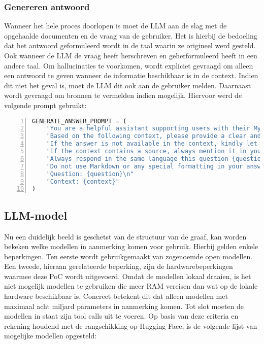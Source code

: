 \subsubsection{Genereren antwoord}

Wanneer het hele proces doorlopen is moet de LLM aan de slag met de opgehaalde documenten en de vraag van de gebruiker. Het is hierbij de bedoeling dat het antwoord geformuleerd wordt in de taal waarin ze origineel werd gesteld. Ook wanneer de LLM de vraag heeft herschreven en geherformuleerd heeft in een andere taal. Om hallucinaties te voorkomen, wordt expliciet gevraagd om alleen een antwoord te geven wanneer de informatie beschikbaar is in de context. Indien dit niet het geval is, moet de LLM dit ook aan de gebruiker melden. Daarnaast wordt gevraagd om bronnen te vermelden indien mogelijk. Hiervoor werd de volgende prompt gebruikt: 

\begin{lstlisting}[basicstyle=\small, frame=single, breaklines=true, postbreak=\mbox{\textcolor{red}{$\hookrightarrow$}\space}, escapeinside ={\%,}, escapechar={!}, numbers=left, language=Python, caption=Prompt voor genereren van antwoord op basis van de opgehaalde context]
GENERATE_ANSWER_PROMPT = (
    "You are a helpful assistant supporting users with their MyMinfin IT-related questions.\n"
    "Based on the following context, please provide a clear and complete answer.\n"
    "If the answer is not available in the context, kindly let the user know that you don't have enough information.\n"
    "If the context contains a source, always mention it in your answer as the reference.\n"
    "Always respond in the same language this question {question} is asked, even if the context is in a different language.\n"
    "Do not use Markdown or any special formatting in your answer, respond in plain text only.\n\n"
    "Question: {question}\n"
    "Context: {context}"
)
\end{lstlisting}

\subsection{LLM-model}

Nu een duidelijk beeld is geschetst van de structuur van de graaf, kan worden bekeken welke modellen in aanmerking komen voor gebruik. Hierbij gelden enkele beperkingen. Ten eerste wordt gebruikgemaakt van zogenoemde open modellen. Een tweede, hieraan gerelateerde beperking, zijn de hardwarebeperkingen waarmee deze PoC wordt uitgevoerd. Omdat de modellen lokaal draaien, is het niet mogelijk modellen te gebruiken die meer RAM vereisen dan wat op de lokale hardware beschikbaar is. Concreet betekent dit dat alleen modellen met maximaal acht miljard parameters in aanmerking komen. Tot slot moeten de modellen in staat zijn tool calls uit te voeren. Op basis van deze criteria en rekening houdend met de rangschikking op Hugging Face, is de volgende lijst van mogelijke modellen opgesteld:

